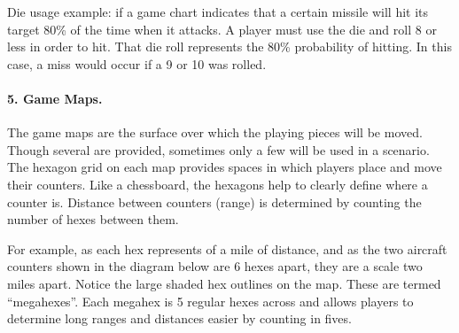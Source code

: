 Die usage example: if a game chart indicates that a certain missile will hit its target 80\% of the time when it attacks. A player must use the die and roll 8 or less in order to hit. That die roll represents the 80\% probability of hitting. In this case, a miss would occur if a 9 or 10 was rolled.

\paragraph{5. Game Maps.} The game maps are the surface over which the playing pieces will be moved. Though several are provided, sometimes only a few will be used in a scenario. The hexagon grid on each map provides spaces in which players place and move their counters. Like a chessboard, the hexagons help to clearly define where a counter is. Distance between counters (range) is determined by counting the number of hexes between them.

For example, as each hex represents {\onethird} of a mile of distance, and as the two aircraft counters shown in the diagram below are 6 hexes apart, they are a scale two miles apart. 
Notice the large shaded hex outlines on the map. These are termed “megahexes”. Each megahex is 5 regular hexes across and allows players to determine long ranges and distances easier by counting in fives. 

\begin{figure}[h!]
\centering
{}
\end{figure}